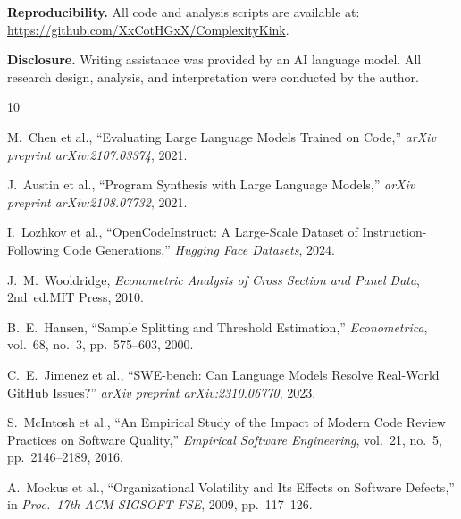 \documentclass[conference]{IEEEtran}
\begin{document}
\textbf{Reproducibility.} All code and analysis scripts are available at: \url{https://github.com/XxCotHGxX/ComplexityKink}.

\textbf{Disclosure.} Writing assistance was provided by an AI language model. All research design, analysis, and interpretation were conducted by the author.


\begin{thebibliography}{10}

M.~Chen et al., ``Evaluating Large Language Models Trained on Code,'' \emph{arXiv preprint arXiv:2107.03374}, 2021.

J.~Austin et al., ``Program Synthesis with Large Language Models,'' \emph{arXiv preprint arXiv:2108.07732}, 2021.

I.~Lozhkov et al., ``OpenCodeInstruct: A Large-Scale Dataset of Instruction-Following Code Generations,'' \emph{Hugging Face Datasets}, 2024.

J.~M.~Wooldridge, \emph{Econometric Analysis of Cross Section and Panel Data}, 2nd~ed.\hspace{1em}MIT Press, 2010.

B.~E.~Hansen, ``Sample Splitting and Threshold Estimation,'' \emph{Econometrica}, vol.~68, no.~3, pp.~575--603, 2000.

C.~E.~Jimenez et al., ``SWE-bench: Can Language Models Resolve Real-World GitHub Issues?'' \emph{arXiv preprint arXiv:2310.06770}, 2023.

S.~McIntosh et al., ``An Empirical Study of the Impact of Modern Code Review Practices on Software Quality,'' \emph{Empirical Software Engineering}, vol.~21, no.~5, pp.~2146--2189, 2016.

A.~Mockus et al., ``Organizational Volatility and Its Effects on Software Defects,'' in \emph{Proc.\ 17th ACM SIGSOFT FSE}, 2009, pp.~117--126.

\end{thebibliography}
\end{document}
